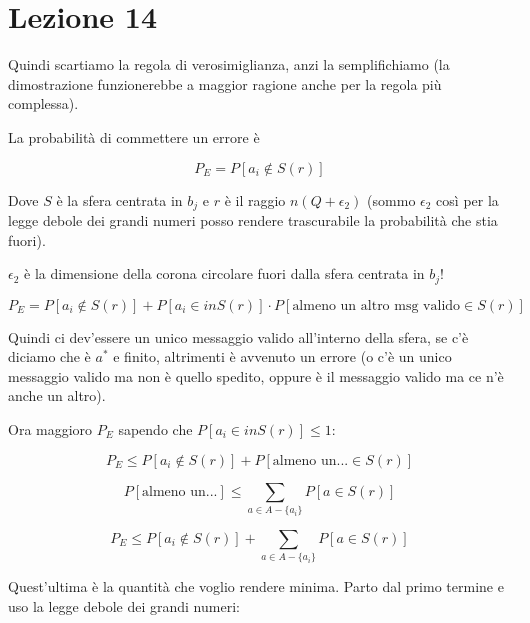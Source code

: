 \section*{Lezione 14}

Quindi scartiamo la regola di verosimiglianza, anzi la semplifichiamo (la dimostrazione funzionerebbe a maggior ragione anche per la regola più complessa).

La probabilità di commettere un errore è

\begin{equation*}
P_E = P[a_i \notin S(r)]
\end{equation*}

Dove $S$ è la sfera centrata in $b_j$ e $r$ è il raggio $n(Q + \epsilon_2)$ (sommo $\epsilon_2$ così per la legge debole dei grandi numeri posso rendere trascurabile la probabilità che stia fuori).

$\epsilon_2$ è la dimensione della corona circolare fuori dalla sfera centrata in $b_j$!

\begin{equation*}
P_E = P[a_i \notin S(r)] + P[a_i \in in S(r)] \cdot P[\text{almeno un altro msg valido} \in S(r)]
\end{equation*}

Quindi ci dev'essere un unico messaggio valido all'interno della sfera, se c'è diciamo che è $a^*$ e finito, altrimenti è avvenuto un errore (o c'è un unico messaggio valido ma non è quello spedito, oppure è il messaggio valido ma ce n'è anche un altro).

Ora maggioro $P_E$ sapendo che $P[a_i \in in S(r)] \leq 1$:

\begin{equation*}
P_E \leq P[a_i \notin S(r)] + P[\text{almeno un...} \in S(r)]
\end{equation*}

\begin{equation*}
P[\text{almeno un...}] \leq \sum_{a \in A - \{a_i\}} P[a \in S(r)]
\end{equation*}

\begin{equation*}
P_E \leq P[a_i \notin S(r)] + \sum_{a \in A - \{a_i\}} P[a \in S(r)]
\end{equation*}

Quest'ultima è la quantità che voglio rendere minima.
Parto dal primo termine e uso la legge debole dei grandi numeri:

